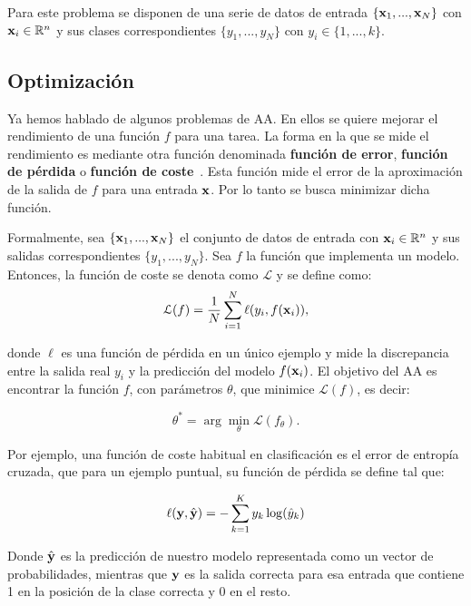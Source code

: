 Para este problema se disponen de una serie de datos de entrada $\{\textnormal{\textbf{x}}_1,...,\textnormal{\textbf{x}}_N\}$ con $\textnormal{\textbf{x}}_i\in\mathbb{R}^n$ y sus clases correspondientes $\{y_1,...,y_N\}$ con $y_i \in \{1,...,k\}$.  


\subsection{Optimización} \label{optimización}

Ya hemos hablado de algunos problemas de AA. En ellos se quiere mejorar el rendimiento de una función $f$ para una tarea. La forma en la que se mide el rendimiento es mediante otra función denominada \textbf{función de error}, \textbf{función de pérdida} o \textbf{función de coste}~\cite{Goodfellow-et-al-2016}. Esta función mide el error de la aproximación de la salida de $f$ para una entrada $\textnormal{\textbf{x}}$. Por lo tanto se busca minimizar dicha función.

Formalmente, sea $\{\textnormal{\textbf{x}}_1,...,\textnormal{\textbf{x}}_N\}$ el conjunto de datos de entrada con $\textnormal{\textbf{x}}_i\in\mathbb{R}^n$ y sus salidas correspondientes  $\{y_1,...,y_N\}$. Sea $f$ la función que implementa un modelo. Entonces, la función de coste se denota como $\mathcal{L}$ y se define como:
\begin{equation}
\mathcal{L}(f) = \frac{1}{N} \sum_{i=1}^{N} \ell(y_i, f(\textnormal{\textbf{x}}_i)),
\end{equation}

donde $\ell$ es una función de pérdida en un único ejemplo y mide la discrepancia entre la salida real $y_i$ y la predicción del modelo $f(\textnormal{\textbf{x}}_i)$. El objetivo del AA es encontrar la función $f$, con parámetros $\theta$, que minimice $\mathcal{L}(f)$, es decir:

\begin{equation}
\theta^* = \arg\min_{\theta} \mathcal{L}(f_\theta).
\end{equation}

Por ejemplo, una función de coste habitual en clasificación es el error de entropía cruzada, que para un ejemplo puntual, su función de pérdida se define tal que:

\begin{align*}
\ell(\textnormal{\textbf{y}}, \hat{\textnormal{\textbf{y}}}) = - \sum_{k=1}^{K} y_k \log(\hat{y}_k)
\end{align*} 

Donde $\hat{\textnormal{\textbf{y}}}$ es la predicción de nuestro modelo representada como un vector de probabilidades, mientras que $\textnormal{\textbf{y}}$ es la salida correcta para esa entrada que contiene 1 en la posición de la clase correcta y 0 en el resto.

